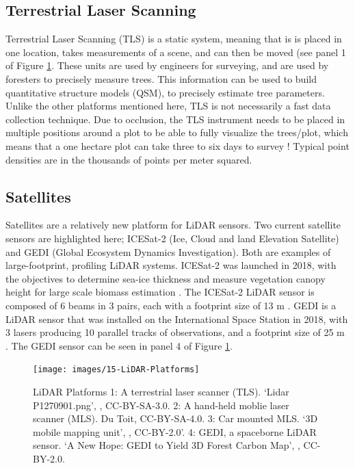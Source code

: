 \documentclass[
]{book}
\begin{document}
\subsection{Terrestrial Laser Scanning}\label{terrestrial-laser-scanning}

Terrestrial Laser Scanning (TLS) is a static system, meaning that is is placed in one location, takes measurements of a scene, and can then be moved (see panel 1 of Figure \ref{fig:15-LiDAR-Platforms}. These units are used by engineers for surveying, and are used by foresters to precisely measure trees. This information can be used to build quantitative structure models (QSM), to precisely estimate tree parameters. Unlike the other platforms mentioned here, TLS is not necessarily a fast data collection technique. Due to occlusion, the TLS instrument needs to be placed in multiple positions around a plot to be able to fully visualize the trees/plot, which means that a one hectare plot can take three to six days to survey \citep{wilkes_understanding_2015}! Typical point densities are in the thousands of points per meter squared.

\subsection{Satellites}\label{satellites}

Satellites are a relatively new platform for LiDAR sensors. Two current satellite sensors are highlighted here; ICESat-2 (Ice, Cloud and land Elevation Satellite) and GEDI (Global Ecosystem Dynamics Investigation). Both are examples of large-footprint, profiling LiDAR systems. ICESat-2 was launched in 2018, with the objectives to determine sea-ice thickness and measure vegetation canopy height for large scale biomass estimation \citep{nasa_icesat-2_2021}. The ICESat-2 LiDAR sensor is composed of 6 beams in 3 pairs, each with a footprint size of 13 m \citep{nasa_icesat-2_2021}. GEDI is a LiDAR sensor that was installed on the International Space Station in 2018, with 3 lasers producing 10 parallel tracks of observations, and a footprint size of 25 m \citep{nasa_gedi_2021}. The GEDI sensor can be seen in panel 4 of Figure \ref{fig:15-LiDAR-Platforms}.



\begin{figure}
\texttt{[image: images/15-LiDAR-Platforms]} \caption{LiDAR Platforms 1: A terrestrial laser scanner (TLS). `Lidar P1270901.png', \citep{monniaux_lidar_2007}, CC-BY-SA-3.0. 2: A hand-held moblie laser scanner (MLS). Du Toit, CC-BY-SA-4.0. 3: Car mounted MLS. `3D mobile mapping unit', \citep{oregon_department_of_transportation_3d_2016}, CC-BY-2.0'. 4: GEDI, a spaceborne LiDAR sensor. `A New Hope: GEDI to Yield 3D Forest Carbon Map', \citep{neon_education_key_2014}, CC-BY-2.0.}\label{fig:15-LiDAR-Platforms}
\end{figure}
\end{document}
